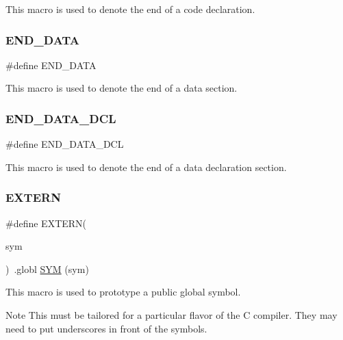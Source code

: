 This macro is used to denote the end of a code declaration. \mbox{\label{group__RTEMSScoreCPUx86-64ASM_gab989978585b78e98ff314e8abb5f9bb0}} 
\subsubsection{\texorpdfstring{END\_DATA}{END\_DATA}}
{\footnotesize\ttfamily \#define E\+N\+D\+\_\+\+D\+A\+TA}

This macro is used to denote the end of a data section. \mbox{\label{group__RTEMSScoreCPUx86-64ASM_gaba5951c6a7df52e7c13d07a6823e9758}} 
\subsubsection{\texorpdfstring{END\_DATA\_DCL}{END\_DATA\_DCL}}
{\footnotesize\ttfamily \#define E\+N\+D\+\_\+\+D\+A\+T\+A\+\_\+\+D\+CL}

This macro is used to denote the end of a data declaration section. \mbox{\label{group__RTEMSScoreCPUx86-64ASM_ga9808b867f8d1bd54d78548a5cd5dc415}} 
\subsubsection{\texorpdfstring{EXTERN}{EXTERN}}
{\footnotesize\ttfamily \#define E\+X\+T\+E\+RN(\begin{DoxyParamCaption}\item[{}]{sym }\end{DoxyParamCaption})~.globl \mbox{\hyperlink{group__RTEMSScoreCPUx86-64ASM_gafe05d428a5f345f51fb591debb815325}{S\+YM}} (sym)}

This macro is used to prototype a public global symbol.

\begin{DoxyNote}{Note}
This must be tailored for a particular flavor of the C compiler. They may need to put underscores in front of the symbols. 
\end{DoxyNote}
\mbox{\label{group__RTEMSScoreCPUx86-64ASM_ga5e536c0e80cb78da6a74541281111e40}} 
